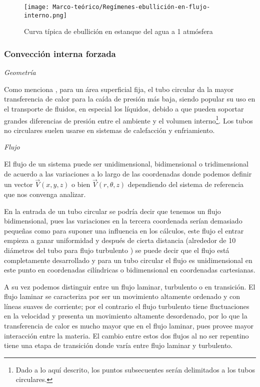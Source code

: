 			\begin{figure}[H]
				\centering
				\texttt{[image: Marco-teórico/Regímenes-ebullición-en-flujo-interno.png]}
				\caption{Curva típica de ebullición en estanque del agua a 1 atmósfera}
				\label{fig:Regimenes-ebullicion-en-flujo-interno}
			\end{figure}

			\subsubsection{Convección interna forzada}

				{\textit{Geometría}}

				Como menciona \cite{cengel_transferencia_2010}, para un área superficial fija, el tubo circular da la mayor transferencia de calor para la caída de presión más baja, siendo popular su uso en el transporte de fluidos, en especial los líquidos, debido a que pueden soportar grandes diferencias de presión entre el ambiente y el volumen interno\footnote{Dado a lo aquí descrito, los puntos subsecuentes serán delimitados a los tubos circulares.}. Los tubos no circulares suelen usarse en sistemas de calefacción y enfriamiento.

				{\textit{Flujo}}

				El flujo de un sistema puede ser unidimensional, bidimensional o tridimensional de acuerdo a las variaciones a lo largo de las coordenadas donde podemos definir un vector $\vec{V}(x,y,z)$ o bien $\vec{V}(r,\theta,z)$ dependiendo del sistema de referencia que nos convenga analizar.

				En la entrada de un tubo circular se podría decir que tenemos un flujo bidimensional, pues las variaciones en la tercera coordenada serían demasiado pequeñas como para suponer una influencia en los cálculos, este flujo el entrar empieza a ganar uniformidad y después de cierta distancia (alrededor de 10 diámetros del tubo para flujo turbulento \cite{cengel_transferencia_2010}) se puede decir que el flujo está completamente desarrollado y para un tubo circular el flujo es unidimensional en este punto en coordenadas cilíndricas o bidimensional en coordenadas cartesianas.

				A su vez podemos distinguir entre un flujo laminar, turbulento o en transición. El flujo laminar se caracteriza por ser un movimiento altamente ordenado y con líneas suaves de corriente; por el contrario el flujo turbulento tiene fluctuaciones en la velocidad y presenta un movimiento altamente desordenado, por lo que la transferencia de calor es mucho mayor que en el flujo laminar, pues provee mayor interacción entre la materia. El cambio entre estos dos flujos al no ser repentino tiene una etapa de transición donde varía entre flujo laminar y turbulento.

